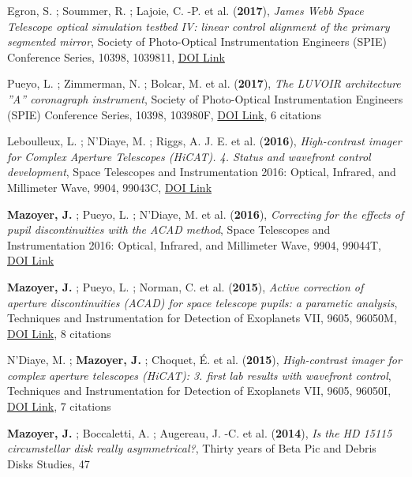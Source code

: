 \documentclass[11pt]{article}
\begin{document}
\begin{etaremune}
\item Egron, S. ; Soummer, R. ; Lajoie, C. -P. et al. ({\bf2017}), {\it James Webb Space Telescope optical simulation testbed IV: linear control alignment of the primary segmented mirror}, Society of Photo-Optical Instrumentation Engineers (SPIE) Conference Series, 10398, 1039811, \href{https://doi.org/10.1117/12.2272981}{DOI Link}

\item Pueyo, L. ; Zimmerman, N. ; Bolcar, M. et al. ({\bf2017}), {\it The LUVOIR architecture ''A'' coronagraph instrument}, Society of Photo-Optical Instrumentation Engineers (SPIE) Conference Series, 10398, 103980F, \href{https://doi.org/10.1117/12.2274654}{DOI Link}, 6 citations

\item Leboulleux, L. ; N'Diaye, M. ; Riggs, A. J. E. et al. ({\bf2016}), {\it High-contrast imager for Complex Aperture Telescopes (HiCAT). 4. Status and wavefront control development}, Space Telescopes and Instrumentation 2016: Optical, Infrared, and Millimeter Wave, 9904, 99043C, \href{https://doi.org/10.1117/12.2233640}{DOI Link}

\item {\bf Mazoyer, J.} ; Pueyo, L. ; N'Diaye, M. et al. ({\bf2016}), {\it Correcting for the effects of pupil discontinuities with the ACAD method}, Space Telescopes and Instrumentation 2016: Optical, Infrared, and Millimeter Wave, 9904, 99044T, \href{https://doi.org/10.1117/12.2232907}{DOI Link}

\item {\bf Mazoyer, J.} ; Pueyo, L. ; Norman, C. et al. ({\bf2015}), {\it Active correction of aperture discontinuities (ACAD) for space telescope pupils: a parametic analysis}, Techniques and Instrumentation for Detection of Exoplanets VII, 9605, 96050M, \href{https://doi.org/10.1117/12.2188692}{DOI Link}, 8 citations

\item N'Diaye, M. ; {\bf Mazoyer, J.} ; Choquet, {\'E}. et al. ({\bf2015}), {\it High-contrast imager for complex aperture telescopes (HiCAT): 3. first lab results with wavefront control}, Techniques and Instrumentation for Detection of Exoplanets VII, 9605, 96050I, \href{https://doi.org/10.1117/12.2188497}{DOI Link}, 7 citations

\item {\bf Mazoyer, J.} ; Boccaletti, A. ; Augereau, J. -C. et al. ({\bf2014}), {\it Is the HD 15115 circumstellar disk really asymmetrical?}, Thirty years of Beta Pic and Debris Disks Studies, 47


\end{etaremune}
\end{document}
